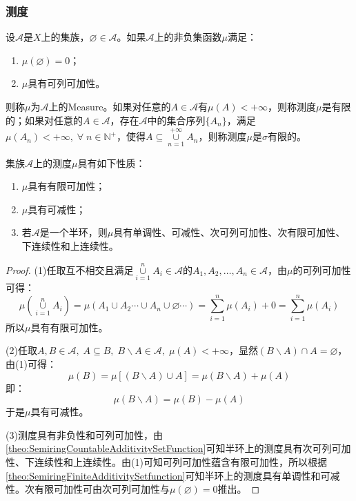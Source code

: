 \subsubsection{测度}
\begin{definition}
	设$\mathscr{A}$是$X$上的集族，$\varnothing\in\mathscr{A}$。如果$\mathscr{A}$上的非负集函数$\mu$满足：
	\begin{enumerate}
		\item $\mu(\varnothing)=0$；
		\item $\mu$具有可列可加性。
	\end{enumerate}
	则称$\mu$为$\mathscr{A}$上的\gls{Measure}。如果对任意的$A\in\mathscr{A}$有$\mu(A)<+\infty$，则称测度$\mu$是有限的；如果对任意的$A\in\mathscr{A}$，存在$\mathscr{A}$中的集合序列$\{A_n\}$，满足$\mu(A_n)<+\infty,\;\forall\;n\in\mathbb{N}^+$，使得$A\subseteq\underset{n=1}{\overset{+\infty}{\cup}}A_n$，则称测度$\mu$是$\sigma$有限的。
\end{definition}
\begin{property}\label{prop:Measure}
	集族$\mathscr{A}$上的测度$\mu$具有如下性质：
	\begin{enumerate}
		\item $\mu$具有有限可加性；
		\item $\mu$具有可减性；
		\item  若$\mathscr{A}$是一个半环，则$\mu$具有单调性、可减性、次可列可加性、次有限可加性、下连续性和上连续性。
	\end{enumerate}
\end{property}
\begin{proof}
	(1)任取互不相交且满足$\underset{i=1}{\overset{n}{\cup}}A_i\in\mathscr{A}$的$A_1,A_2,\dots,A_n\in\mathscr{A}$，由$\mu$的可列可加性可得：
	\begin{equation*}
		\mu\left(\underset{i=1}{\overset{n}{\cup}}A_i\right)=\mu(A_1\cup A_2\cdots\cup A_n\cup\varnothing\cdots)=\sum_{i=1}^{n}\mu(A_i)+0=\sum_{i=1}^{n}\mu(A_i)
	\end{equation*}
	所以$\mu$具有有限可加性。\par
	(2)任取$A,B\in\mathscr{A},\;A\subseteq B,\;B\backslash A\in\mathscr{A},\;\mu(A)<+\infty$，显然$(B\backslash A)\cap A=\varnothing$，由(1)可得：
	\begin{equation*}
		\mu(B)=\mu[(B\backslash A)\cup A]=\mu(B\backslash A)+\mu(A)
	\end{equation*}
	即：
	\begin{equation*}
		\mu(B\backslash A)=\mu(B)-\mu(A)
	\end{equation*}
	于是$\mu$具有可减性。\par
	(3)测度具有非负性和可列可加性，由\cref{theo:SemiringCountableAdditivitySetFunction}可知半环上的测度具有次可列可加性、下连续性和上连续性。由(1)可知可列可加性蕴含有限可加性，所以根据\cref{theo:SemiringFiniteAdditivitySetfunction}可知半环上的测度具有单调性和可减性。次有限可加性可由次可列可加性与$\mu(\varnothing)=0$推出。
\end{proof}
